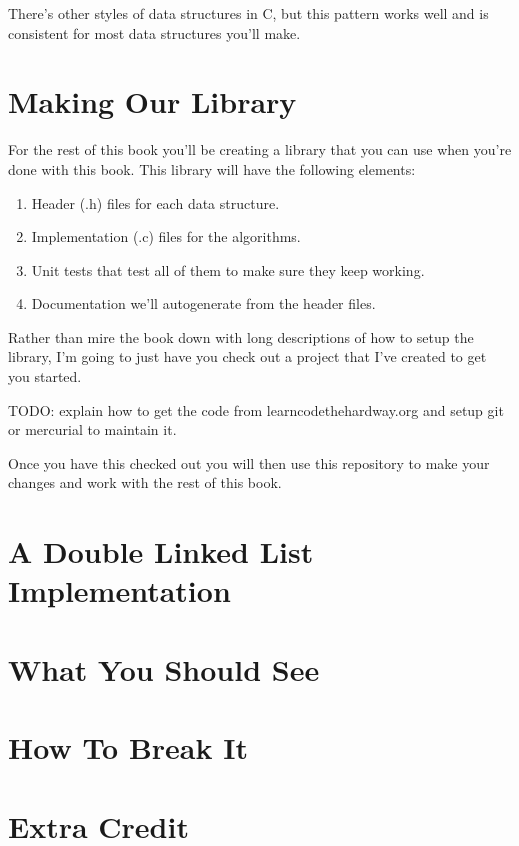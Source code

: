 There's other styles of data structures in C, but this pattern works well and is consistent for most data
structures you'll make.


\section{Making Our Library}

For the rest of this book you'll be creating a library that you can use when you're done with this book.  This library will
have the following elements:

\begin{enumerate}
\item Header (.h) files for each data structure.
\item Implementation (.c) files for the algorithms.
\item Unit tests that test all of them to make sure they keep working.
\item Documentation we'll autogenerate from the header files.
\end{enumerate}

Rather than mire the book down with long descriptions of how to setup the library, I'm going to just have you check
out a project that I've created to get you started.

TODO: explain how to get the code from learncodethehardway.org and setup git or mercurial to maintain it.

Once you have this checked out you will then use this repository to make your changes and work with the rest
of this book.


\section{A Double Linked List Implementation}



\section{What You Should See}


\section{How To Break It}


\section{Extra Credit}



